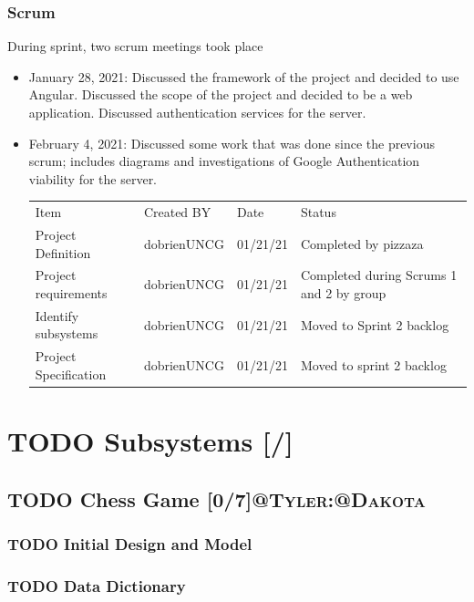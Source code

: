 \documentclass[11pt]{article}
\begin{document}
\subsubsection{Scrum}
\label{sec:org27900fe}
During sprint, two scrum meetings took place
\begin{itemize}
\item January 28, 2021: Discussed the framework of the project and
decided to use Angular. Discussed the scope of the project and
decided to be a web application. Discussed authentication
services for the server.
\item February 4, 2021: Discussed some work that was done since the
previous scrum; includes diagrams and investigations of Google
Authentication viability for the server.

\begin{center}
\begin{tabular}{llll}
Item & Created BY & Date & Status\\
Project Definition & dobrienUNCG & 01/21/21 & Completed by pizzaza\\
Project requirements & dobrienUNCG & 01/21/21 & Completed during Scrums 1 and 2 by group\\
Identify subsystems & dobrienUNCG & 01/21/21 & Moved to Sprint 2 backlog\\
Project Specification & dobrienUNCG & 01/21/21 & Moved to sprint 2 backlog\\
\end{tabular}
\end{center}
\end{itemize}

\section{{\bfseries\sffamily TODO} Subsystems [/]}
\label{sec:orgd82a615}
\subsection{{\bfseries\sffamily TODO} Chess Game [0/7]\hfill{}\textsc{@Tyler:@Dakota}}
\label{sec:orgafad8d8}
\subsubsection{{\bfseries\sffamily TODO} Initial Design and Model}
\label{sec:org3e109c5}
\subsubsection{{\bfseries\sffamily TODO} Data Dictionary}
\label{sec:org4167410}
\end{document}
